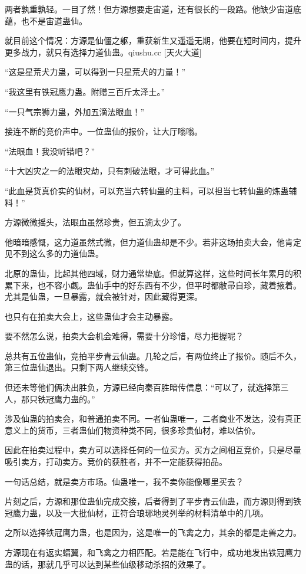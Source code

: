 \begin{this_body}
两者孰重孰轻。一目了然！但方源想要走宙道，还有很长的一段路。他缺少宙道底蕴，也不是宙道蛊仙。

就目前这个情况：方源是仙僵之躯，重获新生又遥遥无期，他要在短时间内，提升更多战力，就只有选择力道仙蛊。qiushu.cc [天火大道]

“这是星荒犬力蛊，可以得到一只星荒犬的力量！”

“我这里有铁冠鹰力蛊。附赠三百斤太泽土。”

“一只气宗狮力蛊，外加五滴法眼血！”

接连不断的竞价声中。一位蛊仙的报价，让大厅嗡嗡。

“法眼血！我没听错吧？”

“十大凶灾之一的法眼灾劫，只有刺破法眼，才可得此血。”

“此血是货真价实的仙材，可以充当六转仙蛊的主料，可以担当七转仙蛊的炼蛊辅料！”

方源微微摇头，法眼血虽然珍贵，但五滴太少了。

他暗暗感慨，这力道虽然式微，但力道仙蛊却是不少。若非这场拍卖大会，他肯定见不到这么多的力道仙蛊。

北原的蛊仙，比起其他四域，财力通常垫底。但就算这样，这些时间长年累月的积累下来，也不容小觑。蛊仙手中的好东西有不少，但平时都敝帚自珍，藏着掖着。尤其是仙蛊，一旦暴露，就会被针对，因此藏得更深。

也只有在拍卖大会上，这些蛊仙才会主动暴露。

要不然怎么说，拍卖大会机会难得，需要十分珍惜，尽力把握呢？

总共有五位蛊仙，竞拍平步青云仙蛊。几轮之后，有两位终止了报价。随后不久，第三位蛊仙退出。只剩下两人继续交锋。

但还未等他们俩决出胜负，方源已经向秦百胜暗传信息：“可以了，就选择第三人，那只铁冠鹰力蛊的。”

涉及仙蛊的拍卖会，和普通拍卖不同。一者仙蛊唯一，二者商业不发达，没有真正意义上的货币，三者蛊仙们物资种类不同，很多珍贵仙材，难以估价。

因此在拍卖过程中，卖方可以选择任何的一位买方。买方之间相互竞价，只是尽量吸引卖方，打动卖方。竞价的获胜者，并不一定能获得拍品。

一句话总结，就是卖方市场。仙蛊唯一，我不卖你能像哪里买去？

片刻之后，方源和那位蛊仙完成交接，后者得到了平步青云仙蛊，而方源则得到铁冠鹰力蛊，以及一大批仙材，正符合琅琊地灵列举的材料清单中的几项。

之所以选择铁冠鹰力蛊，也是因为，这是唯一的飞禽之力，其余的都是走兽之力。

方源现在有返实蝠翼，和飞禽之力相匹配。若是能在飞行中，成功地发出铁冠鹰力蛊的话，那就几乎可以达到某些仙级移动杀招的效果了。


\end{this_body}
